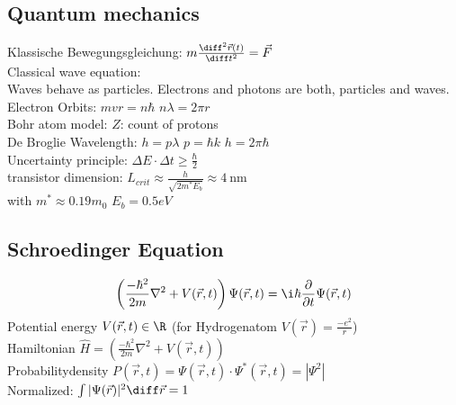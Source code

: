 \documentclass[fs, footer]{latex4ei}
\begin{document}
\begin{multicols}{4}
\section{Quantum mechanics}
	Klassische Bewegungsgleichung: $m \frac{\diff^2 \vec r(t)}{\diff t^2} = \vec F$\\
	Classical wave equation:\\
	 
	Waves behave as particles. Electrons and photons are both, particles and waves.\\
	Electron Orbits: $mvr = n \hbar$ \quad $n \lambda = 2 \pi r$\\
	Bohr atom model:  \qquad $Z$: count of protons\\
	De Broglie Wavelength: $h = p \lambda$ \quad $p = \hbar k$ \quad $h = 2\pi \hbar$\\
	Uncertainty principle:  \qquad $\Delta E \cdot \Delta t \ge \frac{ \hbar }{2}$\\
	transistor dimension: $L_{crit} \approx \frac{h}{\sqrt{2m^* E_b}} \approx \SI{4}{\nano \meter}$\\ with $m^* \approx 0.19m_0$ \quad $E_b = 0.5eV$\\ 

	\subsection{Schroedinger Equation}
	\begin{equation}
		\left( \frac{-\hbar^2}{2m} \nabla^2 + V(\vec r,t)  \right) \Psi(\vec r,t) = \i \hbar \frac{\partial}{\partial t} \Psi(\vec r,t)
	\end{equation}
	Potential energy $V(\vec r,t) \in \R$ \qquad (for Hydrogenatom $V(\vec r) = \frac{-e^2}{r}$)\\
	Hamiltonian $\hat H = \left( \frac{-\hbar^2}{2m} \nabla^2 + V(\vec r,t)  \right)$\\
	Probabilitydensity $P(\vec r,t) = \Psi(\vec r,t) \cdot \Psi^* (\vec r,t) = |\Psi^2|$\\
	Normalized: $\int |\Psi(\vec r)|^2 \diff \vec r = 1$\\
	

\end{multicols}
\end{document}
